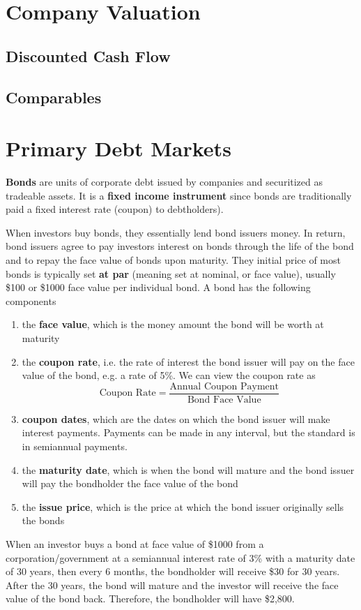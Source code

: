 \documentclass{article}
\begin{document}
\section{Company Valuation}

  \subsection{Discounted Cash Flow}

  \subsection{Comparables}

\section{Primary Debt Markets}

    \begin{definition}[Bond]
      \textbf{Bonds} are units of corporate debt issued by companies and securitized as tradeable assets. It is a \textbf{fixed income instrument} since bonds are traditionally paid a fixed interest rate (coupon) to debtholders). 

      When investors buy bonds, they essentially lend bond issuers money. In return, bond issuers agree to pay investors interest on bonds through the life of the bond and to repay the face value of bonds upon maturity. They initial price of most bonds is typically set \textbf{at par} (meaning set at nominal, or face value), usually \$100 or \$1000 face value per individual bond. A bond has the following components
      \begin{enumerate}
        \item the \textbf{face value}, which is the money amount the bond will be worth at maturity
        \item the \textbf{coupon rate}, i.e. the rate of interest the bond issuer will pay on the face value of the bond, e.g. a rate of 5\%. We can view the coupon rate as 
        \[\text{Coupon Rate} = \frac{\text{Annual Coupon Payment}}{\text{Bond Face Value}}\]
        \item \textbf{coupon dates}, which are the dates on which the bond issuer will make interest payments. Payments can be made in any interval, but the standard is in semiannual payments. 
        \item the \textbf{maturity date}, which is when the bond will mature and the bond issuer will pay the bondholder the face value of the bond 
        \item the \textbf{issue price}, which is the price at which the bond issuer originally sells the bonds
      \end{enumerate}
      When an investor buys a bond at face value of \$1000 from a corporation/government at a semiannual interest rate of 3\% with a maturity date of 30 years, then every 6 months, the bondholder will receive \$30 for 30 years. After the 30 years, the bond will mature and the investor will receive the face value of the bond back. Therefore, the bondholder will have \$2,800. 
    \end{definition}
\end{document}
